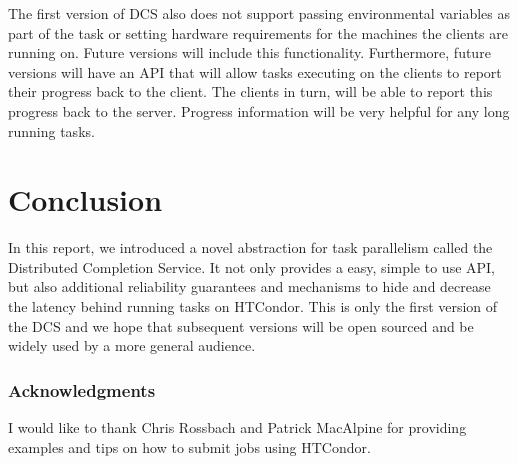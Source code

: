 \documentclass{article}
\begin{document}
The first version of DCS also does not support passing environmental variables as part of the task or setting hardware requirements for the machines the clients are running on. Future versions will include this functionality. Furthermore, future versions will have an API that will allow tasks executing on the clients to report their progress back to the client. The clients in turn, will be able to report this progress back to the server. Progress information will be very helpful for any long running tasks.

\section{Conclusion}

In this report, we introduced a novel abstraction for task parallelism called the Distributed Completion Service. It not only provides a easy, simple to use API, but also additional reliability guarantees and mechanisms to hide and decrease the latency behind running tasks on HTCondor. This is only the first version of the DCS and we hope that subsequent versions will be open sourced and be widely used by a more general audience.

\subsubsection*{Acknowledgments}

I would like to thank Chris Rossbach and Patrick MacAlpine for providing examples and tips on how to submit jobs using HTCondor.



\end{document}
